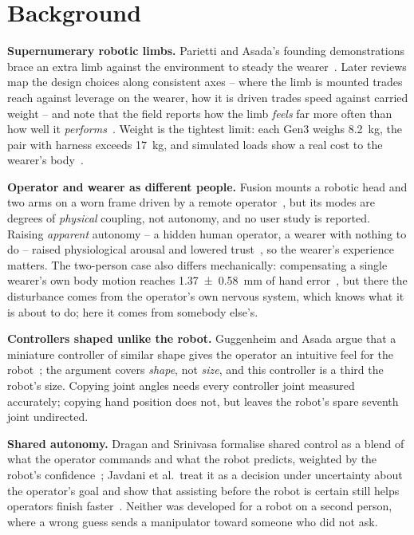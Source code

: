 \chapter{Background}
\label{ch:background}

\textbf{Supernumerary robotic limbs.} Parietti and Asada's founding
demonstrations brace an extra limb against the environment to steady the
wearer~\cite{parietti2014bracing,parietti2013dynamic}. Later reviews map the design choices along consistent axes -- where the
limb is mounted trades reach against leverage on the wearer, how it is
driven trades speed against carried weight -- and note that the field
reports how the limb \emph{feels} far more often than how well it
\emph{performs}~\cite{yang2021srlreview,prattichizzo2021augmentation,tong2021srlreview,zhang2023srlreview,zheng2026quantitative}.
Weight is the tightest limit: each Gen3 weighs \SI{8.2}{\kilo\gram}, the
pair with harness exceeds \SI{17}{\kilo\gram}, and simulated loads show a
real cost to the wearer's body~\cite{moon2024impact}.

\textbf{Operator and wearer as different people.} Fusion mounts a robotic
head and two arms on a worn frame driven by a remote
operator~\cite{saraiji2018fusion}, but its modes are degrees of
\emph{physical} coupling, not autonomy, and no user study is reported.
Raising \emph{apparent} autonomy -- a hidden human operator, a wearer with
nothing to do -- raised physiological arousal and lowered
trust~\cite{zhou2026proxemics}, so the wearer's experience matters. The
two-person case also differs mechanically: compensating a single wearer's
own body motion reaches \SI{1.37 \pm 0.58}{\milli\metre} of hand
error~\cite{zhang2024motioncomp}, but there the disturbance comes from the
operator's own nervous system, which knows what it is about to do; here it
comes from somebody else's.

\textbf{Controllers shaped unlike the robot.} Guggenheim and Asada argue
that a miniature controller of similar shape gives the operator an
intuitive feel for the robot~\cite{guggenheim2021haptic}; the argument
covers \emph{shape}, not \emph{size}, and this controller is a third the
robot's size. Copying joint angles needs every controller joint measured
accurately; copying hand position does not, but leaves the robot's spare
seventh joint undirected.

\textbf{Shared autonomy.} Dragan and Srinivasa formalise shared control as
a blend of what the operator commands and what the robot predicts, weighted
by the robot's confidence~\cite{dragan2013policyblending}; Javdani et al.\
treat it as a decision under uncertainty about the operator's goal and show
that assisting before the robot is certain still helps operators finish
faster~\cite{javdani2015hindsight}. Neither was developed for a robot on a
second person, where a wrong guess sends a manipulator toward someone who
did not ask.

